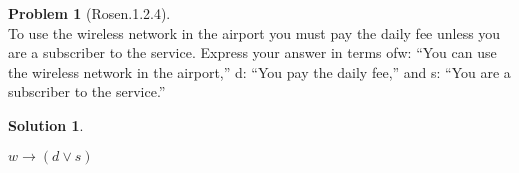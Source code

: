 \documentclass{article}
\theoremstyle{definition}
\newtheorem*{problem}{Problem}
\newtheorem*{solution}{Solution}
\begin{document}
\begin{problem}[Rosen.1.2.4]\ \\
To use the wireless network in the airport you must pay
the daily fee unless you are a subscriber to the service.
Express your answer in terms ofw: “You can use the wireless
network in the airport,” d: “You pay the daily fee,”
and s: “You are a subscriber to the service.”
\begin{compactenum}
\renewcommand{\theenumi}{\alph{enumi}}

\end{compactenum}
\end{problem}

\begin{solution}\ \\
\begin{compactenum}
\renewcommand{\theenumi}{\alph{enumi}}
$w \rightarrow (d \vee s)$
\end{compactenum}
\end{solution}
\end{document}
